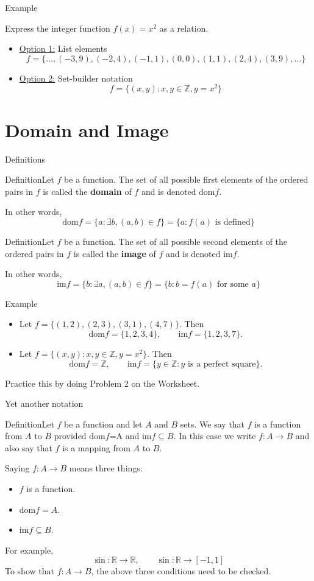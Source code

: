 \documentclass{beamer}
\def\bl[#1]#2{\begin{block}{#1}#2\end{block}}
\def\itemb{\begin{itemize}}
\def\iteme{\end{itemize}}
\begin{document}
\begin{frame}{Example}
\bl[]{Express the integer function $f(x)=x^2$ as a relation.}

\itemb
\item \underline{Option 1:} List elements
\[
f=\{\dots, (-3,9),(-2,4), (-1,1), (0,0), (1,1), (2,4), (3,9),\dots\}
\]\vspace{0.4cm}
\item \underline{Option 2:} Set-builder notation
\[
f=\{(x,y): x,y\in\mathbb{Z}, y=x^2\}
\]
\iteme

\end{frame}

\section{Domain and Image}

\begin{frame}{Definitions}
\bl[Definition]{Let $f$ be a function. The set of all possible first elements of the ordered pairs in $f$ is called the \textbf{domain} of $f$ and is denoted $\textrm{dom} f$.}
In other words,
\[
\textrm{dom} f=\{a:\exists b, (a,b)\in f\}=\{a:f(a)\textrm{ is defined}\}
\]

\bl[Definition]{Let $f$ be a function. The set of all possible second elements of the ordered pairs in $f$ is called the \textbf{image} of $f$ and is denoted $\textrm{im} f$.}
In other words,
\[
\textrm{im} f=\{b:\exists a, (a,b)\in f\}=\{b: b= f(a)\textrm{ for some $a$}\}
\]
\end{frame}

\begin{frame}{Example}
\itemb
\item Let $f=\{(1,2),(2,3),(3,1),(4,7)\}$. Then
\[
\textrm{dom} f=\{1,2,3,4\},\qquad\textrm{im}f=\{1,2,3,7\}.
\]
\item Let $f=\{(x,y): x,y\in\mathbb{Z}, y=x^2\}$. Then
\[
\textrm{dom} f=\mathbb{Z},\qquad\textrm{im}f=\{y\in\mathbb{Z}: \textrm{$y$ is a perfect square}\}.
\]
\iteme
\center Practice this by doing Problem 2 on the Worksheet.
\end{frame}

\begin{frame}{Yet another notation}
\bl[Definition]{Let $f$ be a function and let $A$ and $B$ sets. We say that $f$ is a function from $A$ to $B$ provided $\textrm{dom}f$=A and $\textrm{im} f\subseteq B$. In this case we write $f:A\to B$ and also say that $f$ is a mapping from $A$ to $B$.}
Saying $f: A\to B$ means three things:
\itemb
\item $f$ is a function.
\item $\textrm{dom}f=A$.
\item $\textrm{im}f\subseteq B$.
\iteme
For example,
\[
\sin:\mathbb{R}\to\mathbb{R},\qquad \sin:\mathbb{R}\to [-1,1]
\]
To show that $f:A\to B$, the above three conditions need to be checked.
\end{frame}
\end{document}
